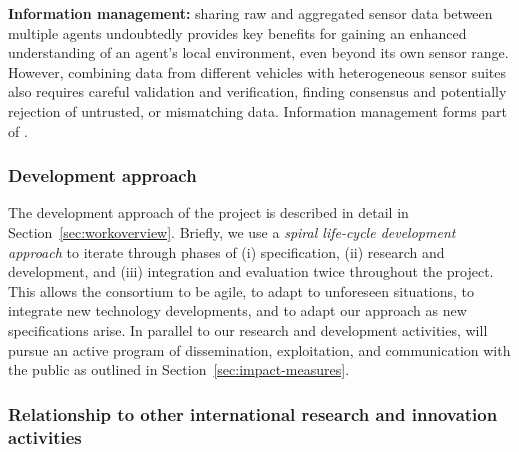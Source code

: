 \begin{denseItemize}
\item \textbf{Information management:} sharing raw and aggregated sensor data between multiple agents undoubtedly provides key benefits for gaining an enhanced understanding of an agent's local environment, even beyond its own sensor range. However, combining data from different vehicles with heterogeneous sensor suites also requires careful validation and verification, finding consensus and potentially rejection of untrusted, or mismatching data. Information management forms part of \WPMapping.
\end{denseItemize}


\subsubsection{Development approach }
The development approach of the \Project{} project is described in detail in Section~\ref{sec:workoverview}. Briefly, we use a {\em spiral life-cycle development approach} to iterate through phases of (i) specification, (ii) research and development, and (iii) integration and evaluation twice throughout the project. This allows the consortium to be agile, to adapt to unforeseen situations, to integrate new technology developments, and to adapt our approach as new specifications arise. In parallel to our research and development activities, \Project{} will pursue an active program of dissemination, exploitation, and communication with the public as outlined in Section~\ref{sec:impact-measures}.



\subsubsection{Relationship to other international research and innovation activities} 

